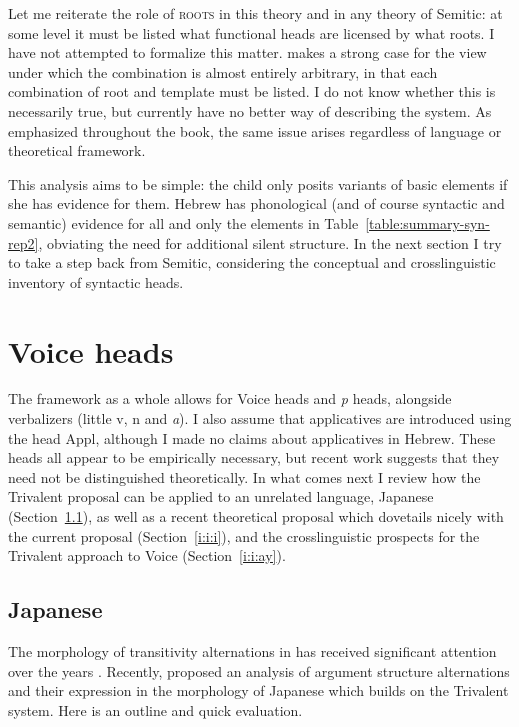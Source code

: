 \begin{exe}
\begin{xlist}
\begin{xlist}
\begin{xlist}
\begin{xlist}
\begin{xlist}
\begin{xlist}
\begin{exe}
\begin{xlist}
\begin{exe}
\begin{exe}
\begin{xlist}
\begin{exe}
Let me reiterate the role of \textsc{roots} in this theory and in any theory of Semitic: at some level it must be listed what functional heads are licensed by what roots. I have not attempted to formalize this matter. \cite{arad05} makes a strong case for the view under which the combination is almost entirely arbitrary, in that each combination of root and template must be listed. I do not know whether this is necessarily true, but currently have no better way of describing the system. As emphasized throughout the book, the same issue arises regardless of language or theoretical framework.

This analysis aims to be simple: the child only posits variants of basic elements if she has evidence for them. Hebrew has phonological (and of course syntactic and semantic) evidence for all and only the elements in Table~\ref{table:summary-syn-rep2}, obviating the need for additional silent structure. In the next section I try to take a step back from Semitic, considering the conceptual and crosslinguistic inventory of syntactic heads.


\section{Voice heads} \label{i:i}
The framework as a whole allows for Voice heads and \emph{p} heads, alongside verbalizers (little v, n and \textit{a}). I also assume that applicatives are introduced using the head Appl, although I made no claims about applicatives in Hebrew. These heads all appear to be empirically necessary, but recent work suggests that they need not be distinguished theoretically. In what comes next I review how the Trivalent proposal can be applied to an unrelated language, Japanese (Section~\ref{i:i:jap}), as well as a recent theoretical proposal which dovetails nicely with the current proposal (Section~\ref{i:i:i}), and the crosslinguistic prospects for the Trivalent approach to Voice (Section~\ref{i:i:ay}).

	\subsection{Japanese} \label{i:i:jap}
The morphology of transitivity alternations in  has received significant attention over the years \citep{suga80,jacobsen92,miyagawa98,nishiyama98,volpe05,harley08}. Recently, \cite{oseki17nyu} proposed an analysis of argument structure alternations and their expression in the morphology of Japanese which builds on the Trivalent system. Here is an outline and quick evaluation.


\end{exe}
\end{xlist}
\end{exe}
\end{exe}
\end{xlist}
\end{exe}
\end{xlist}
\end{xlist}
\end{xlist}
\end{xlist}
\end{xlist}
\end{xlist}
\end{exe}
